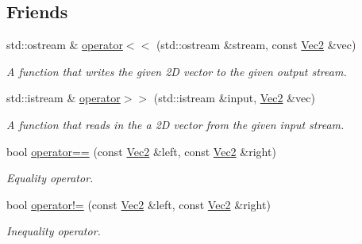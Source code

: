 \subsection*{Friends}
\begin{DoxyCompactItemize}
\item 
std\+::ostream \& \hyperlink{classgofxmath_1_1_vec2_a4318103522da957a7fea3f3454f663fa}{operator$<$$<$} (std\+::ostream \&stream, const \hyperlink{classgofxmath_1_1_vec2}{Vec2} \&vec)
\begin{DoxyCompactList}\small\item\em A function that writes the given 2\+D vector to the given output stream. \end{DoxyCompactList}\item 
std\+::istream \& \hyperlink{classgofxmath_1_1_vec2_ae05b41fed2d1147f95d2e43e75463fa4}{operator$>$$>$} (std\+::istream \&input, \hyperlink{classgofxmath_1_1_vec2}{Vec2} \&vec)
\begin{DoxyCompactList}\small\item\em A function that reads in the a 2\+D vector from the given input stream. \end{DoxyCompactList}\item 
bool \hyperlink{classgofxmath_1_1_vec2_abed4a0c0a66b1b50c31c8448ddb2384d}{operator==} (const \hyperlink{classgofxmath_1_1_vec2}{Vec2} \&left, const \hyperlink{classgofxmath_1_1_vec2}{Vec2} \&right)
\begin{DoxyCompactList}\small\item\em Equality operator. \end{DoxyCompactList}\item 
bool \hyperlink{classgofxmath_1_1_vec2_a95f55509aeacabec75d0a5289c57cfcc}{operator!=} (const \hyperlink{classgofxmath_1_1_vec2}{Vec2} \&left, const \hyperlink{classgofxmath_1_1_vec2}{Vec2} \&right)
\begin{DoxyCompactList}\small\item\em Inequality operator. \end{DoxyCompactList}\end{DoxyCompactItemize}
